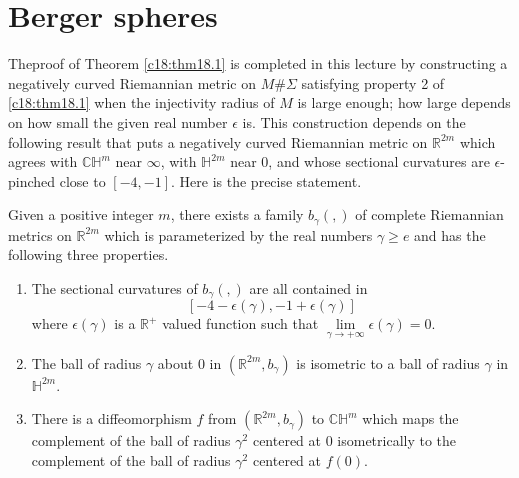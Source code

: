 \chapter{Berger spheres}\label{c19}

The\pageoriginale proof of Theorem \ref{c18:thm18.1} is completed in
this lecture by constructing a negatively curved Riemannian metric on
$M\# \Sigma$ satisfying property 2 of \ref{c18:thm18.1} when the
injectivity radius of $M$ is large enough; how large depends on how
small the given real number $\epsilon$ is. This construction depends
on the following result that puts a negatively curved Riemannian
metric on $\mathbb{R}^{2m}$ which agrees with $\mathbb{CH}^{m}$ near
$\infty$, with $\mathbb{H}^{2m}$ near $0$, and whose sectional
curvatures are $\epsilon$-pinched close to $[-4,-1]$. Here is the
precise statement.

\begin{lemma}\label{c19:lem19.1}
Given a positive integer $m$, there exists a family $b_{\gamma}(,)$ of
complete Riemannian metrics on $\mathbb{R}^{2m}$ which is
parameterized by the real numbers $\gamma\geq e$ and has the following
three properties.
\begin{enumerate}
\item The sectional curvatures of $b_{\gamma}(,)$ are all contained in
$$
[-4-\epsilon(\gamma),-1+\epsilon(\gamma)]
$$ 
where $\epsilon(\gamma)$
  is a $\mathbb{R}^{+}$ valued function such that
  $\lim\limits_{\gamma\to +\infty}\epsilon(\gamma)=0$.

\item The ball of radius $\gamma$ about $0$ in
  $(\mathbb{R}^{2m},b_{\gamma})$ is isometric to a ball of radius
  $\gamma$ in $\mathbb{H}^{2m}$.

\item There is a diffeomorphism $f$ from
  $(\mathbb{R}^{2m},b_{\gamma})$ to $\mathbb{CH}^{m}$ which maps the
  complement of the ball of radius $\gamma^{2}$ centered at $0$
  isometrically to the complement of the ball of radius $\gamma^{2}$
  centered at $f(0)$.
\end{enumerate}
\end{lemma}

